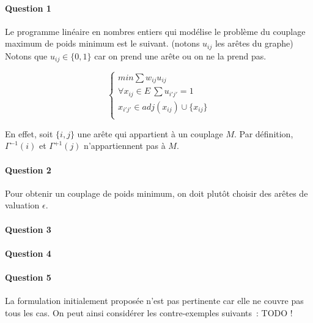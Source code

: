 \paragraph{Question 1}Le programme linéaire en nombres entiers qui modélise le
  problème du couplage maximum de poids minimum est le suivant.
  (notons $u_{ij}$ les arêtes du graphe)
Notons que $u_{ij} \in \{0, 1\}$ car on prend une arête ou on ne la
prend pas.

\begin{equation}
\begin{cases}
min \sum w_{ij} u_{ij} \\
\forall x_{ij} \in E ~ \sum u_{i' j'} = 1 \\
 x_{i' j'} \in adj(x_{ij}) \cup \{ x_{ij} \} \\
\end{cases}
\end{equation}

En effet, soit $\{ i, j \}$ une arête qui appartient à un couplage
$M$. Par définition, $\Gamma^{-1}(i) $ et $\Gamma^{+1}(j)$
n'appartiennent pas à $M$.

\paragraph{Question 2}

Pour obtenir un couplage de poids minimum, on doit plutôt choisir des
arêtes de valuation $\epsilon$.

\paragraph{Question 3}
\paragraph{Question 4}
\paragraph{Question 5}
La formulation initialement proposée n'est pas pertinente car elle ne
couvre pas tous les cas. On peut ainsi considérer les contre-exemples
suivants~: TODO !